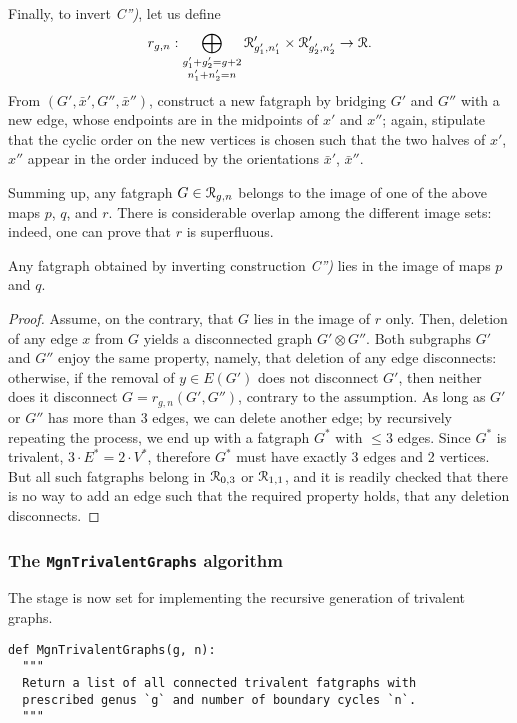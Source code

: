 Finally, to invert {\slshape C'')}, let us define
\begin{equation*}
r_{g,n}: \bigoplus_{\substack{g'_1+g'_2=g+2 \\ n'_1+n'_2=n}} 
\mathcal{R}'_{g'_1, n'_1} \times \mathcal{R}'_{g'_2, n'_2} \to \mathcal{R}.
\end{equation*}
From $(G', \bar{x}', G'',
\bar{x}'')$, construct a new fatgraph by bridging $G'$ and $G''$ with
a new edge, whose endpoints are in the midpoints of $x'$ and $x''$;
again, stipulate that the cyclic order on the new vertices is chosen
such that the two halves of $x'$, $x''$ appear in the order induced by
the orientations $\bar{x}'$, $\bar{x}''$.

Summing up, any fatgraph $G \in \mathcal{R}_{g,n}$ belongs to the image of one
of the above maps $p$, $q$, and $r$. There is considerable
overlap among the different image sets: indeed, one can prove that
$r$ is superfluous.
\begin{lemma}\label{lemma:no-c2}
  Any fatgraph obtained by inverting construction {\slshape C'')} lies in
  the image of maps $p$ and $q$.
\end{lemma}
\begin{proof}
  Assume, on the contrary, that $G$ lies in the image of $r$ only.
  Then, deletion of any edge $x$ from $G$ yields a disconnected graph
  $G' \otimes G''$.  Both subgraphs $G'$ and $G''$ enjoy the same
  property, namely, that deletion of any edge disconnects: otherwise,
  if the removal of $y \in E(G')$ does not disconnect $G'$, then
  neither does it disconnect $G = r_{g,n}(G', G'')$, contrary to the
  assumption. As long as $G'$ or $G''$ has more than 3 edges, we can
  delete another edge; by recursively repeating the process, we end up
  with a fatgraph $G^*$ with $\leq 3$ edges.  Since $G^*$ is
  trivalent, $3 \cdot E^* = 2 \cdot V^*$, therefore $G^*$ must have
  exactly 3 edges and 2 vertices. But all such fatgraphs belong in
  $\mathcal{R}_{0,3}$ or $\mathcal{R}_{1,1}$, and it is readily checked that there is no
  way to add an edge such that the required property holds, that any
  deletion disconnects.
\end{proof}

\subsubsection{The \protect\Verb`MgnTrivalentGraphs` algorithm}
\label{sec:MgnTrivalentGraphs}

The stage is now set for implementing the recursive generation of
trivalent graphs.
\begin{lstlisting}[name=MgnTrivalentGraphs,firstnumber=1]
def MgnTrivalentGraphs(g, n):
  """
  Return a list of all connected trivalent fatgraphs with
  prescribed genus `g` and number of boundary cycles `n`.
  """
\end{lstlisting}

